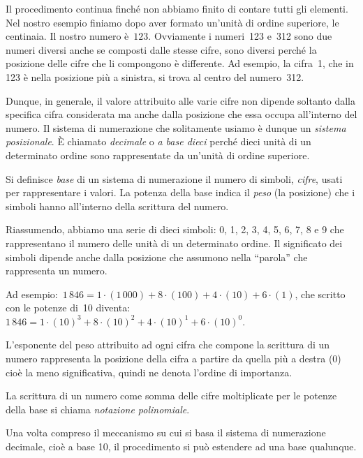 Il procedimento continua finché non abbiamo finito di contare tutti gli elementi. Nel nostro esempio finiamo dopo aver formato
un'unità di ordine superiore, le centinaia. Il nostro numero è~$123$.
Ovviamente i numeri~123 e~312 sono due numeri diversi anche se composti dalle stesse cifre, sono diversi
perché la posizione delle cifre che li compongono è differente. Ad esempio, la cifra~1, che in 123 è nella posizione più a sinistra,
si trova al centro del numero~312.

Dunque, in generale, il valore attribuito alle varie cifre non dipende soltanto dalla specifica cifra considerata ma
anche dalla posizione che essa occupa all'interno del numero. Il sistema di numerazione
che solitamente usiamo è dunque un \emph{sistema posizionale}. \`E chiamato \emph{decimale} o \emph{a base
dieci} perché dieci unità di un determinato ordine sono rappresentate da un'unità di ordine superiore.

\begin{definizione}\label{def:base}
Si definisce \emph{base} di un sistema di numerazione il numero di
simboli, \emph{cifre}, usati per rappresentare i valori. La potenza della base indica il \emph{peso} (la posizione)
che i simboli hanno all'interno della scrittura del numero.
\end{definizione}

Riassumendo, abbiamo una serie di dieci simboli: 0, 1, 2, 3, 4, 5, 6, 7,
8 e 9 che rappresentano il numero delle unità di un determinato ordine.
Il significato dei simboli dipende anche dalla posizione che assumono
nella ``parola'' che rappresenta un numero.

Ad esempio:~$1\,846=1\cdot(1\,000)+8\cdot(100)+4\cdot(10)+6\cdot(1)$, che scritto con le potenze di~10 diventa:
$1\,846=1\cdot(10)^{3}+8\cdot (10)^{2}+4\cdot (10)^{1}+6\cdot (10)^{0}$.

L'esponente del peso attribuito ad ogni cifra che compone la scrittura di un numero
rappresenta la posizione della cifra a partire da quella più a destra (0) cioè la meno significativa,
quindi ne denota l'ordine di importanza.

\begin{definizione}
La scrittura di un numero come somma delle cifre moltiplicate per le potenze della
base si chiama \emph{notazione polinomiale}.
\end{definizione}

Una volta compreso il meccanismo su cui si basa il sistema
di numerazione decimale, cioè a base 10, il procedimento si può estendere ad una base
qualunque.

